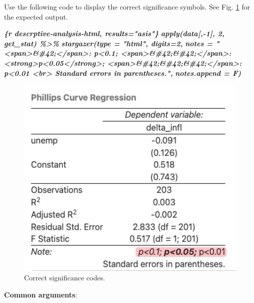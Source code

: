 \documentclass[
  a4paper,
  twoside,
  openright]{book}
\newenvironment{Shaded}{\begin{snugshade}}{\end{snugshade}}
\newcommand{\InformationTok}[1]{\textcolor[rgb]{0.56,0.35,0.01}{\textbf{\textit{#1}}}}
\theoremstyle{definition}
\theoremstyle{definition}
\theoremstyle{definition}
\theoremstyle{definition}
\theoremstyle{remark}
\begin{document}
Use the following code to display the correct significance symbols. See Fig. \ref{fig:stargazer2} for the expected output.

\begin{Shaded}
\begin{Highlighting}[]
\InformationTok{\textasciigrave{}\textasciigrave{}\textasciigrave{}\{r descrptive{-}analysis{-}html, results="asis"\}}
\InformationTok{apply(data[,{-}1], 2, get\_stat) \%\textgreater{}\% }
\InformationTok{    stargazer(type = "html", digits=2, }
\InformationTok{              notes = "\textless{}span\textgreater{}\&\#42;\textless{}/span\textgreater{}: p\textless{}0.1; \textless{}span\textgreater{}\&\#42;\&\#42;\textless{}/span\textgreater{}: \textless{}strong\textgreater{}p\textless{}0.05\textless{}/strong\textgreater{}; \textless{}span\textgreater{}\&\#42;\&\#42;\&\#42;\textless{}/span\textgreater{}: p\textless{}0.01 \textless{}br\textgreater{} Standard errors in parentheses.",}
\InformationTok{              notes.append = F)}
\InformationTok{\textasciigrave{}\textasciigrave{}\textasciigrave{}}
\end{Highlighting}
\end{Shaded}

\begin{figure}
\includegraphics[width=5.51in]{images/stargazer1} \caption{Correct significance codes.}\label{fig:stargazer2}
\end{figure}

\textbf{Common arguments}:
\end{document}
